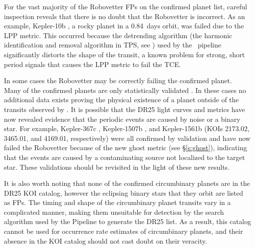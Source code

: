 For the vast majority of the Robovetter FPs on the confirmed planet list, careful inspection reveals that there is no doubt that the Robovetter is incorrect. As an example, Kepler-10b \citep[][]{Batalha2011Kepler10,Fogtmann2014Kepler10}, a rocky planet in a 0.84~days orbit, was failed due to the LPP metric. This occurred because the detrending algorithm (the harmonic identification and removal algorithm in TPS, see \citealt{JenkinsKDPH}) used by the \Kepler\ pipeline significantly distorts the shape of the transit, a known problem for strong, short period signals \citep{Christiansen2015} that causes the LPP metric to fail the TCE.

In some cases the Robovetter may be correctly failing the confirmed planet.  Many of the confirmed planets are only statistically validated \citep{Morton2016,Rowe2014}. In these cases no additional data exists proving the physical existence of a planet outside of the transits observed by \Kepler. It is possible that the DR25 light curves and metrics have now revealed evidence that the periodic events are caused by noise or a binary star. For example, Kepler-367c \citep{Rowe2014}, Kepler-1507b \citep{Morton2016}, and Kepler-1561b \citep{Morton2016} (KOIs 2173.02, 3465.01, and 4169.01, respectively) were all confirmed by validation and have now failed the Robovetter because of the new ghost metric (see \S\ref{s:ghost}), indicating that the events are caused by a contaminating source not localized to the target star.  These validations should be revisited in the light of these new results.

{\color{blue}
It is also worth noting that none of the confirmed circumbinary planets \citep[e.g.,][]{Doyle2011,Orosz2012} are in the DR25 KOI catalog, however the eclipsing binary stars that they orbit are listed as FPs.  The timing and shape of the circumbinary planet transits vary in a complicated manner, making them unsuitable for detection by the search algorithm used by the \Kepler{} Pipeline to generate the DR25 \opstce{} list.  As a result, this catalog cannot be used for occurrence rate estimates of circumbinary planets, and their absence in the KOI catalog should not cast doubt on their veracity. 
}



